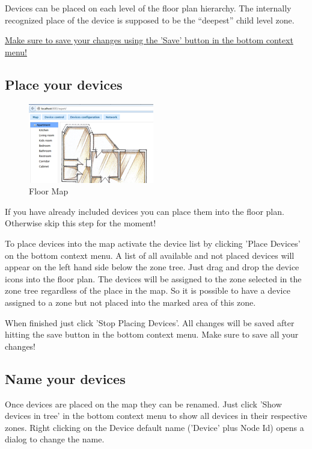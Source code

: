 Devices can be placed on each level of the floor plan hierarchy. The internally recognized place of 
the device is supposed to be the “deepest” child level zone.

\underline{Make sure to save your changes using the 'Save' button in the bottom context menu!}

\subsection{Place your devices}

\begin{figure} 
\begin{center}
\includegraphics[scale=1.0]{pics/map2.png}
\caption{Floor Map}
 
\end{center} 
\end{figure}

If you have already included devices you can place them into the floor plan. Otherwise skip this step for the moment!

To place devices into the map activate the device list by clicking  'Place Devices' on the bottom 
context menu. A list of all available and not placed devices will appear on the left hand side below 
the zone tree. Just drag and drop the device icons into the floor plan. The devices will be assigned 
to the zone selected in the zone tree regardless of the place in the map. So it is possible to have 
a device assigned to a zone but not placed into the marked area of this zone.

When finished just click 'Stop Placing Devices'. All changes will be saved after hitting the save 
button in the bottom context menu. Make sure to save all your changes!

\subsection{Name your devices}

Once devices are placed on the map they can be renamed. Just click  'Show devices in tree' in the 
bottom context menu to show all devices in their respective zones. Right clicking on the Device 
default name ('Device' plus Node Id) opens a dialog to change the name.

